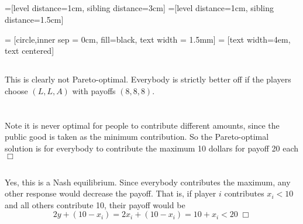 \documentclass{article}
\begin{document}
\subsection{}
=[level distance=1cm, sibling distance=3cm]
=[level distance=1cm, sibling distance=1.5cm]

 = [circle,inner sep = 0cm, fill=black, text width = 1.5mm]
 = [text width=4em, text centered]
\begin{center}
\end{center}

\subsection{}
This is clearly not Pareto-optimal. Everybody is strictly better off if the players choose $(L,L,A)$ with payoffs $(8,8,8)$.

\section{}
\subsection{}
Note it is never optimal for people to contribute different amounts, since the public good is taken as the minimum contribution. So the Pareto-optimal solution is for everybody to contribute the maximum 10 dollars for payoff 20 each $\Box$

\subsection{}
Yes, this is a Nash equilibrium. Since everybody contributes the maximum, any other response would decrease the payoff. That is, if player $i$ contributes $x_i < 10$ and all others contribute 10, their payoff would be
$$2y + (10 - x_i) = 2x_i + (10 - x_i) = 10 + x_i < 20 \; \Box$$
\end{document}
